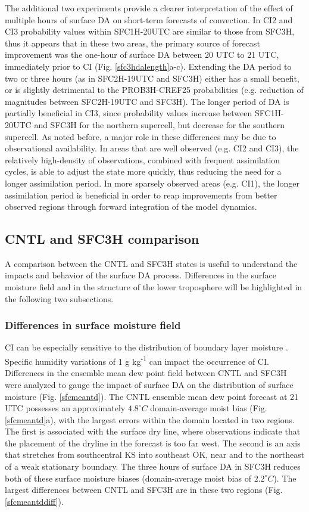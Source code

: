 The additional two experiments provide a clearer interpretation of the effect of multiple hours of surface DA on short-term forecasts of convection. In CI2 and CI3 probability values within SFC1H-20UTC are similar to those from SFC3H, thus it appears that in these two areas, the primary source of forecast improvement was the one-hour of surface DA between 20 UTC to 21 UTC, immediately prior to CI (Fig. \ref{sfc3hdalength}a-c). Extending the DA period to two or three hours (as in SFC2H-19UTC and SFC3H) either has a small benefit, or is slightly detrimental to the PROB3H-CREF25 probabilities (e.g. reduction of magnitudes between SFC2H-19UTC and SFC3H). The longer period of DA is partially beneficial in CI3, since probability values increase between SFC1H-20UTC and SFC3H for the northern supercell, but decrease for the southern supercell. As noted before, a major role in these differences may be due to observational availability. In areas that are well observed (e.g. CI2 and CI3), the relatively high-density of observations, combined with frequent assimilation cycles, is able to adjust the state more quickly, thus reducing the need for a longer assimilation period. In more sparsely observed areas (e.g. CI1), the longer assimilation period is beneficial in order to reap improvements from better observed regions through forward integration of the model dynamics.

\subsection{CNTL and SFC3H comparison}
A comparison between the CNTL and SFC3H states is useful to understand the impacts and behavior of the surface DA process. Differences in the surface moisture field and in the structure of the lower troposphere will be highlighted in the following two subsections.

\subsubsection{Differences in surface moisture field}
\label{tdsection}
CI can be especially sensitive to the distribution of boundary layer moisture \citep{crook96,weckwerth00}. Specific humidity variations of 1 g kg\textsuperscript{-1} can impact the occurrence of CI. Differences in the ensemble mean dew point field between CNTL and SFC3H were analyzed to gauge the impact of surface DA on the distribution of surface moisture (Fig. \ref{sfcmeantd}). The CNTL ensemble mean dew point forecast at 21 UTC possesses an approximately \(4.8^{\circ}C\) domain-average moist bias (Fig. \ref{sfcmeantd}a), with the largest errors within the domain located in two regions. The first is associated with the surface dry line, where observations indicate that the placement of the dryline in the forecast is too far west. The second is an axis that stretches from southcentral KS into southeast OK, near and to the northeast of a weak stationary boundary. The three hours of surface DA in SFC3H reduces both of these surface moisture biases (domain-average moist bias of \(2.2^{\circ}C\)). The largest differences between CNTL and SFC3H are in these two regions (Fig. \ref{sfcmeantddiff}).

